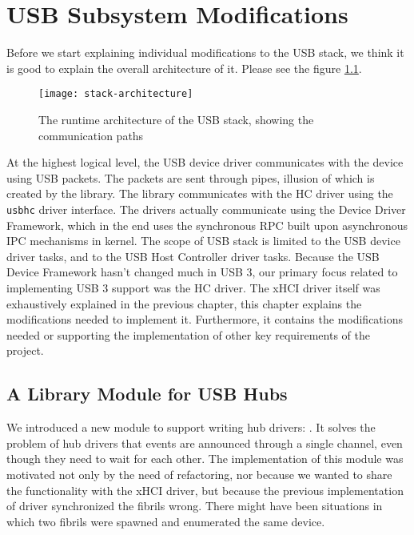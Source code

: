 \chapter{USB Subsystem Modifications}
\label{usb-refactoring}

Before we start explaining individual modifications to the USB stack, we think
it is good to explain the overall architecture of it. Please see the figure
\ref{fig:stack-architecture}.

\begin{figure}[h]
	\centering
	\texttt{[image: stack-architecture]}
	\caption{The runtime architecture of the USB stack, showing the communication paths}
	\label{fig:stack-architecture}
\end{figure}

At the highest logical level, the USB device driver communicates with the
device using USB packets. The packets are sent through pipes, illusion of which
is created by the  library. The library communicates with the HC
driver using the \texttt{usbhc} driver interface. The drivers actually
communicate using the Device Driver Framework, which in the end uses the
synchronous RPC built upon asynchronous IPC mechanisms in kernel. The
scope of USB stack is limited to the USB device driver tasks, and to the USB
Host Controller driver tasks. Because the USB Device Framework hasn't changed much
in USB 3, our primary focus related to implementing USB 3 support was the HC
driver. The xHCI driver itself was exhaustively explained in the previous
chapter, this chapter explains the modifications needed to implement it.
Furthermore, it contains the modifications needed or supporting the
implementation of other key requirements of the project.





\section{A Library Module for USB Hubs}
\label{hub-port-refactoring}

We introduced a new module to support writing hub drivers:
. It solves the problem of
hub drivers that events are announced through a single channel, even though
they need to wait for each other. The implementation of this module was
motivated not only by the need of refactoring, nor because we wanted to share
the functionality with the xHCI driver, but because the previous implementation
of  driver synchronized the fibrils wrong. There might have been
situations in which two fibrils were spawned and enumerated the same device.

